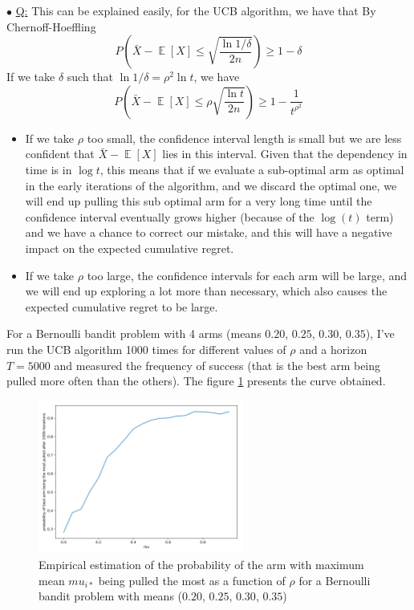 \documentclass[a4paper, 11pt]{article}
\newcounter{cquestion}
\renewcommand{\thecquestion}{\arabic{cquestion}}
\newenvironment{question}
{\par \vspace{0.5em} \noindent \stepcounter{cquestion} \hspace{-1em}
 $\bullet$ \underline{Q\thecquestion :}}
{}
\newcommand{\e}[1]{\mathop{\mathbb{E}}\left[#1\right]}
\newcommand{\ipart}[1]{\vspace{0.5em}\textbf{#1}\vspace{0.5em}}
\begin{document}
\begin{question}
  This can be explained easily, for the UCB algorithm, we have that By
  Chernoff-Hoeffling
  \begin{equation*}
    P\left(\bar{X} - \e{X} \le \sqrt{\dfrac{\ln{1 / \delta}}{2 n}}\right) \ge 1 - \delta
  \end{equation*}
  If we take $\delta$ such that $\ln{1 / \delta} = \rho^2 \ln{t}$, we have
  \begin{equation*}
    P\left(\bar{X} - \e{X} \le \rho \sqrt{\dfrac{\ln{t}}{2 n}}\right) \ge 1 - \dfrac{1}{t^{\rho^2}}
  \end{equation*}


  \begin{itemize}
  \item If we take $\rho$ too small, the confidence interval length is
    small but we are less confident that $\bar{X} - \e{X}$ lies in
    this interval. Given that the dependency in time is in $\log{t}$,
    this means that if we evaluate a sub-optimal arm as optimal in the
    early iterations of the algorithm, and we discard the optimal one,
    we will end up pulling this sub optimal arm for a very long time
    until the confidence interval eventually grows higher (because of
    the $\log(t)$ term) and we have a chance to correct our mistake,
    and this will have a negative impact on the expected cumulative
    regret.

  \item If we take $\rho$ too large, the confidence intervals for each arm
    will be large, and we will end up exploring a lot more than
    necessary, which also causes the expected cumulative regret to be
    large.
  \end{itemize}

  For a Bernoulli bandit problem with 4 arms (means $0.20$, $0.25$,
  $0.30$, $0.35$), I've run the UCB algorithm 1000 times for different
  values of $\rho$ and a horizon $T = 5000$ and measured the frequency
  of success (that is the best arm being pulled more often than the
  others). The figure \ref{fig:ex1-success-ratio} presents the curve
  obtained.

  \begin{figure}[h]
    \centering
    \includegraphics[width=0.6\textwidth]{ex1_success_ratio}
    \caption{Empirical estimation of the probability of the arm with
      maximum mean $mu_{i*}$ being pulled the most as a function of
      $\rho$ for a Bernoulli bandit problem with means ($0.20$,
      $0.25$, $0.30$, $0.35$)}\label{fig:ex1-success-ratio}
  \end{figure}


\end{question}
\end{document}
